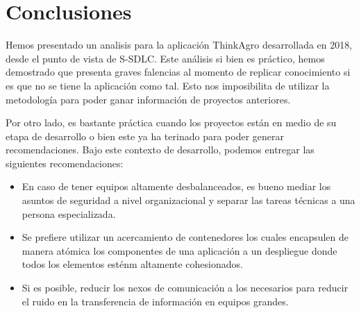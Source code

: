 \section{Conclusiones}

Hemos presentado un analisis para la aplicación ThinkAgro desarrollada en 2018, desde el punto de vista de S-SDLC. Este análisis si bien es práctico, hemos demostrado que presenta graves falencias al momento de replicar conocimiento si es que no se tiene la aplicación como tal. Esto nos imposibilita de utilizar la metodología para poder ganar información de proyectos anteriores.

Por otro lado, es bastante práctica cuando los proyectos están en medio de su etapa de desarrollo o bien este ya ha terinado para poder generar recomendaciones. Bajo este contexto de desarrollo, podemos entregar las siguientes recomendaciones:

\begin{itemize}
    \item En caso de tener equipos altamente desbalanceados, es bueno mediar los asuntos de seguridad a nivel organizacional y separar las tareas técnicas a una persona especializada.
    \item Se prefiere utilizar un acercamiento de contenedores los cuales encapsulen de manera atómica los componentes de una aplicación a un despliegue donde todos los elementos esténm altamente cohesionados.
    \item Si es posible, reducir los nexos de comunicación a los necesarios para reducir el ruido en la transferencia de información en equipos grandes.
\end{itemize}

